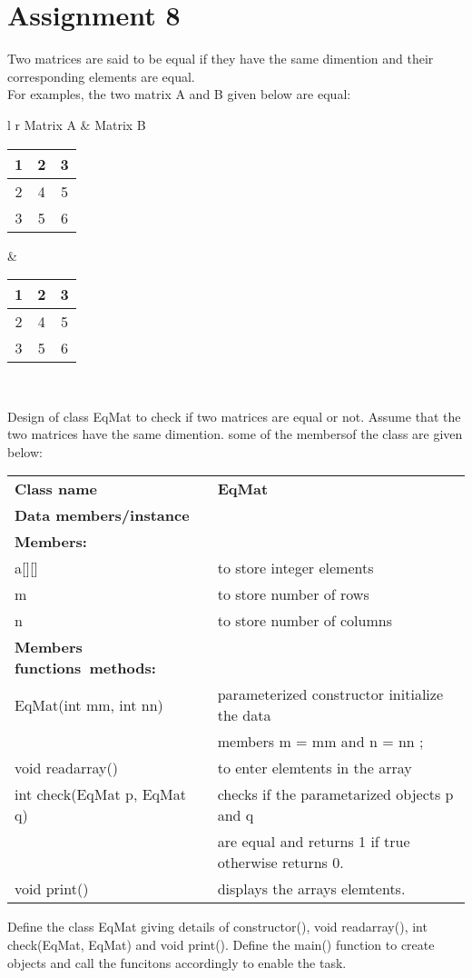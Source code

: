 \section*{\centering Assignment 8}
\vspace{15px}
Two matrices are said to be equal if they have the same dimention and their
corresponding elements are equal.\\
For examples, the two matrix A and B given below are equal:
\begin{center}
\begin{tabular}{ l r }
	Matrix A & Matrix B \\
	\begin{tabular}{|c|c|c|}
\hline
		1 & 2 & 3 \\ \hline
		2 & 4 & 5 \\ \hline
		3 & 5 & 6 \\ \hline
	\end{tabular} & 
	\begin{tabular}{|c|c|c|}
\hline
		1 & 2 & 3 \\ \hline
		2 & 4 & 5 \\ \hline
		3 & 5 & 6 \\ \hline
	\end{tabular}\\
\end{tabular}
\end{center}
Design of class EqMat to check if two matrices are equal or not.
Assume that the two matrices have the same dimention.
some of the membersof the class are given below:\\
\begin{tabular}{ll}
	\textbf{Class name} & \textbf{EqMat} \\
	\textbf{Data  members/instance}\\
	\textbf{Members:}\\
	a[][] & to store integer elements\\
	m & to store number of rows \\
	n & to store number of columns\\
	\textbf{Members functions\ methods:}\\
	EqMat(int mm, int nn) & parameterized constructor initialize the data\\
	& members m = mm and n = nn ;\\
	void readarray() & to enter elemtents in the array \\
	int check(EqMat p, EqMat q) & checks if the parametarized objects p and q\\
	& are equal and returns 1 if true otherwise returns 0. \\
	void print() & displays the arrays elemtents. \\
\end{tabular}
Define the class EqMat giving details of constructor(), void readarray(), int check(EqMat, EqMat) and void
print(). Define the main() function to create objects and call the funcitons accordingly to enable the task.

